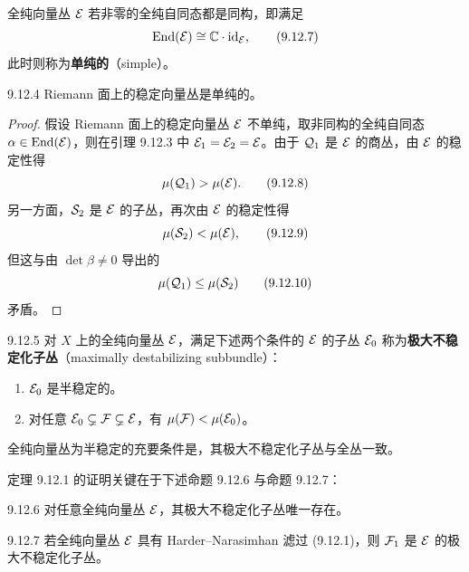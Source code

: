 全纯向量丛 $\mathcal{E}$ 若非零的全纯自同态都是同构，即满足
\begin{equation}
  \operatorname{End}(\mathcal{E})\cong\mathbb{C}\cdot\mathrm{id}_{\mathcal{E}},
  \tag{9.12.7}
\end{equation}
此时则称为\textbf{单纯的}（simple）。

\begin{corollary*}{9.12.4}
  Riemann 面上的稳定向量丛是单纯的。
\end{corollary*}
\begin{proof}
  假设 Riemann 面上的稳定向量丛 $\mathcal{E}$ 不单纯，取非同构的全纯自同态 $\alpha\in\operatorname{End}(\mathcal{E})$，则在引理 9.12.3 中 $\mathcal{E}_1=\mathcal{E}_2=\mathcal{E}$。由于 $\mathcal{Q}_1$ 是 $\mathcal{E}$ 的商丛，由 $\mathcal{E}$ 的稳定性得
  \begin{equation}
    \mu(\mathcal{Q}_1)>\mu(\mathcal{E}).
    \tag{9.12.8}
  \end{equation}
  另一方面，$\mathcal{S}_2$ 是 $\mathcal{E}$ 的子丛，再次由 $\mathcal{E}$ 的稳定性得
  \begin{equation}
    \mu(\mathcal{S}_2)<\mu(\mathcal{E}),
    \tag{9.12.9}
  \end{equation}
  但这与由 $\det\beta\ne0$ 导出的
  \begin{equation}
    \mu(\mathcal{Q}_1)\le\mu(\mathcal{S}_2)
    \tag{9.12.10}
  \end{equation}
  矛盾。
\end{proof}

\begin{definition}{9.12.5}
  对 $X$ 上的全纯向量丛 $\mathcal{E}$，满足下述两个条件的 $\mathcal{E}$ 的子丛 $\mathcal{E}_0$ 称为\textbf{极大不稳定化子丛}（maximally destabilizing subbundle）：
  \begin{enumerate}[label=(\roman*),leftmargin=2.2em,itemsep=1pt,topsep=2pt]
    \item $\mathcal{E}_0$ 是半稳定的。
    \item 对任意 $\mathcal{E}_0\subsetneq\mathcal{F}\subsetneq\mathcal{E}$，有 $\mu(\mathcal{F})<\mu(\mathcal{E}_0)$。
  \end{enumerate}
\end{definition}

全纯向量丛为半稳定的充要条件是，其极大不稳定化子丛与全丛一致。

定理 9.12.1 的证明关键在于下述命题 9.12.6 与命题 9.12.7：

\begin{proposition}{9.12.6}
  对任意全纯向量丛 $\mathcal{E}$，其极大不稳定化子丛唯一存在。
\end{proposition}

\begin{proposition}{9.12.7}
  若全纯向量丛 $\mathcal{E}$ 具有 Harder--Narasimhan 滤过 (9.12.1)，则 $\mathcal{F}_1$ 是 $\mathcal{E}$ 的极大不稳定化子丛。
\end{proposition}


